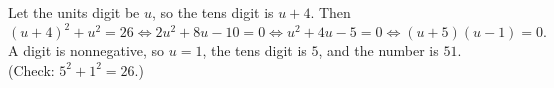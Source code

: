 Let the units digit be $u$, so the tens digit is $u+4$. Then
\[
(u+4)^2+u^2=26\iff 2u^2+8u-10=0\iff u^2+4u-5=0\iff (u+5)(u-1)=0 .
\]
A digit is nonnegative, so $u=1$, the tens digit is $5$, and the number is $\boxed{51}$. (Check: $5^2+1^2=26$.)
